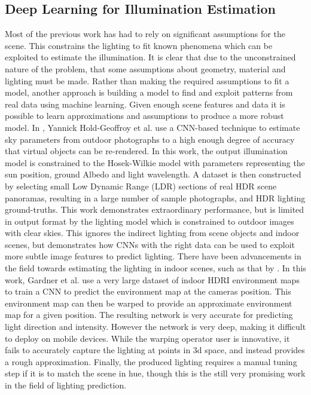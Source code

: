 \documentclass[ %
                    author={Gavin Parker},
                supervisor={Dr. Neill Campbell},
                    degree={MEng},
                     title={Deep Learning for Illumination Estimation from Stereo Images},
                  subtitle={},
                      type={Research},
                      year={2018} ]{dissertation}
\begin{document}
\subsection{Deep Learning for Illumination Estimation}
Most of the previous work has had to rely on significant assumptions for the scene. This constrains the lighting to fit known phenomena which can be exploited to estimate the illumination. It is clear that due to the unconstrained nature of the problem, that some assumptions about geometry, material and lighting must be made. Rather than making the required assumptions to fit a model, another approach is building a model to find and exploit patterns from real data using machine learning. Given enough scene features and data it is possible to learn approximations and assumptions to produce a more robust model. In \cite{holdgeoffroy-cvpr-17}, Yannick Hold-Geoffroy et al. use a CNN-based technique to estimate sky parameters from outdoor photographs to a high enough degree of accuracy that virtual objects can be re-rendered. In this work, the output illumination model is constrained to the Hosek-Wilkie model with parameters representing the sun position, ground Albedo and light wavelength. A dataset is then constructed by selecting small Low Dynamic Range (LDR) sections of real HDR scene panoramas, resulting in a large number of sample photographs, and HDR lighting ground-truths. This work demonstrates extraordinary performance, but is limited in output format by the lighting model which is constrained to outdoor images with clear skies. This ignores the indirect lighting from scene objects and indoor scenes, but demonstrates how CNNs with the right data can be used to exploit more subtle image features to predict lighting.
\newline
There have been advancements in the field towards estimating the lighting in indoor scenes, such as that by \cite{Gardner:2017:LPI:3130800.3130891}. In this work, Gardner et al. use a very large dataset of indoor HDRI environment maps to train a CNN to predict the environment map at the cameras position. This environment map can then be warped to provide an approximate environment map for a given position. The resulting network is very accurate for predicting light direction and intensity. However the network is very deep, making it difficult to deploy on mobile devices. While the warping operator user is innovative, it fails to accurately capture the lighting at points in 3d space, and instead provides a rough approximation. Finally, the produced lighting requires a manual tuning step if it is to match the scene in hue, though this is the still very promising work in the field of lighting prediction.
\end{document}
